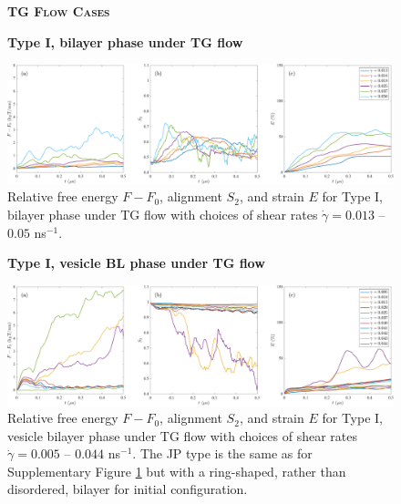 \begin{figure}[h!]
\begin{center}
\textbf{\textsc{TG Flow Cases}}\par\medskip
\textbf{Type I, bilayer  phase under TG flow}\par\medskip
\includegraphics[width=\textwidth]{SMFigures/ULTGRaw.pdf}
\end{center}
\caption{
Relative free energy $F - F_0$,
alignment $S_2$, and strain $E$ for
Type I, bilayer phase under TG flow with choices of shear rates $\dot\gamma=0.013$ -- $0.05$ ns$^{-1}$.
}
\label{fig:ultgraw}
\end{figure}


\begin{figure}[h!]
\begin{center}
\textbf{Type I, vesicle BL phase under TG flow}\par\medskip
\includegraphics[width=\textwidth]{SMFigures/VeTGRaw.pdf}
\end{center}
\caption{
Relative free energy $F - F_0$,
alignment $S_2$, and strain $E$ for
Type I, vesicle bilayer phase under TG flow with choices of shear rates $\dot\gamma=0.005$ -- $0.044$ ns$^{-1}$.
The JP type is the same as for Supplementary Figure \ref{fig:ultgraw} but with a
ring-shaped, rather than disordered, bilayer for initial configuration.  
}
\label{fig:vetgraw}
\end{figure}





